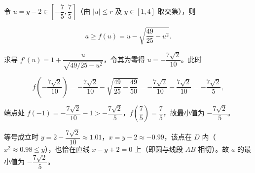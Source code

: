 \begin{answer}
令 $u=y-2\in\left[-\dfrac75,\dfrac75\right]$（由 $|u|\leqslant r$ 及 $y\in[1,4]$ 取交集），则

\nopagebreak[4]
\[a\geqslant f(u)=u-\sqrt{\frac{49}{25}-u^2}.\]

求导 $f'(u)=1+\dfrac{u}{\sqrt{49/25-u^2}}$，令其为零得 $u=-\dfrac{7\sqrt2}{10}$。此时

\nopagebreak[4]
\[f\left(-\frac{7\sqrt2}{10}\right)=-\frac{7\sqrt2}{10}-\sqrt{\frac{49}{25}-\frac{49}{50}}=-\frac{7\sqrt2}{10}-\frac{7\sqrt2}{10}=-\frac{7\sqrt2}{5},\]

端点处 $f(-1)=-\dfrac{7\sqrt2}{10}-1>-\dfrac{7\sqrt2}{5}$，$f\left(\dfrac75\right)=\dfrac75$，故最小值为 $-\dfrac{7\sqrt2}{5}$。

等号成立时 $y=2-\dfrac{7\sqrt2}{10}\approx1.01$，$x=y-2\approx-0.99$，该点在 $D$ 内（$x^2\approx0.98\leqslant y$），也恰在直线 $x-y+2=0$ 上（即圆与线段 $AB$ 相切）。故 $a$ 的最小值为 $-\dfrac{7\sqrt2}{5}$。


\end{answer}
